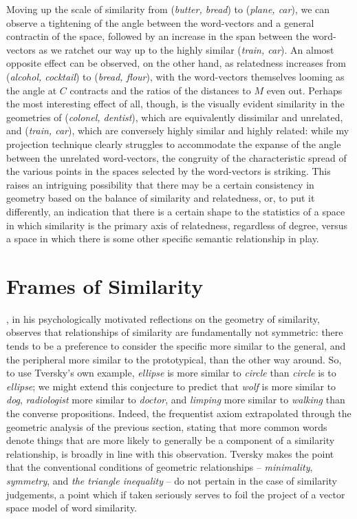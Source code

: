 Moving up the scale of similarity from (\emph{butter, bread}) to (\emph{plane, car}), we can observe a tightening of the angle between the word-vectors and a general contractin of the space, followed by an increase in the span between the word-vectors as we ratchet our way up to the highly similar (\emph{train, car}).  An almost opposite effect can be observed, on the other hand, as relatedness increases from (\emph{alcohol, cocktail}) to (\emph{bread, flour}), with the word-vectors themselves looming as the angle at $C$ contracts and the ratios of the distances to $M$ even out.  Perhaps the most interesting effect of all, though, is the visually evident similarity in the geometries of (\emph{colonel, dentist}), which are equivalently dissimilar and unrelated, and (\emph{train, car}), which are conversely highly similar and highly related: while my projection technique clearly struggles to accommodate the expanse of the angle between the unrelated word-vectors, the congruity of the characteristic spread of the various points in the spaces selected by the word-vectors is striking.  This raises an intriguing possibility that there may be a certain consistency in geometry based on the balance of similarity and relatedness, or, to put it differently, an indication that there is a certain shape to the statistics of a space in which similarity is the primary axis of relatedness, regardless of degree, versus a space in which there is some other specific semantic relationship in play.

\section{Frames of Similarity} \label{sec:frames}
\cite{Tversky1977}, in his psychologically motivated reflections on the geometry of similarity, observes that relationships of similarity are fundamentally not symmetric: there tends to be a preference to consider the specific more similar to the general, and the peripheral more similar to the prototypical, than the other way around.  So, to use Tversky's own example, \emph{ellipse} is more similar to \emph{circle} than \emph{circle} is to \emph{ellipse}; we might extend this conjecture to predict that \emph{wolf} is more similar to \emph{dog}, \emph{radiologist} more similar to \emph{doctor}, and \emph{limping} more similar to \emph{walking} than the converse propositions.  Indeed, the frequentist axiom extrapolated through the geometric analysis of the previous section, stating that more common words denote things that are more likely to generally be a component of a similarity relationship, is broadly in line with this observation.  Tversky makes the point that the conventional conditions of geometric relationships -- \emph{minimality}, \emph{symmetry}, and \emph{the triangle inequality} -- do not pertain in the case of similarity judgements, a point which if taken seriously serves to foil the project of a vector space model of word similarity.

